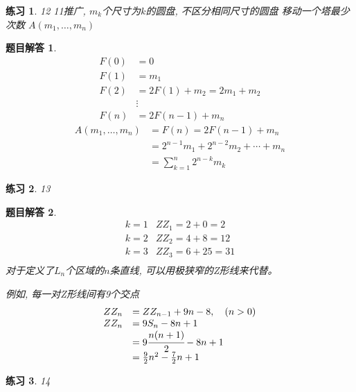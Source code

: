 \documentclass[mode=geye]{elegantnote}
\newtheorem{exercise}{练习}
\newtheorem{answer}{题目解答}
\begin{document}
\begin{exercise}
	12 11推广,	$ m_k $个尺寸为$ k $的圆盘, 不区分相同尺寸的圆盘
	移动一个塔最少次数 $ A(m_1, \dots, m_n) $
\end{exercise}

\begin{answer}
	\begin{align*}
		F(0) 	&= 0	\\
		F(1) 	&= m_1	\\
		F(2) 	&= 2F(1)+m_2 = 2m_1+m_2	\\
				&\vdots	\\
		F(n)	&= 2F(n-1)+m_n
	\end{align*}
	\begin{align*}
		A(m_1, \dots, m_n) 
		&= F(n) = 2F(n-1)+m_n\\
		&= 2^{n-1}m_1+2^{n-2}m_2+\cdots+m_n\\
		&= \sum_{k=1}^{n} 2^{n-k} m_{k}
	\end{align*}
\end{answer}

\begin{exercise}
	13
\end{exercise}

\begin{answer}
	\begin{equation*}
		\begin{array}{ll}
			k=1 & ZZ_1 = 2+0 = 2\\
			k=2	& ZZ_2 = 4+8 = 12\\
			k=3	& ZZ_3 = 6+25 = 31\\
		\end{array}
	\end{equation*}
对于定义了$ L_n $个区域的$ n $条直线, 
可以用极狭窄的Z形线来代替。

例如, 每一对Z形线间有9个交点
\begin{equation}
	\begin{array}{ll}
		ZZ_n 	&= ZZ_{n-1}+9n-8,\quad (n>0)\\
		ZZ_n	&= 9S_n - 8n+1\\
				&= 9\cfrac{n(n+1)}{2} - 8n+1\\
				&= \frac{9}{2}n^2 - \frac{7}{2}n + 1\\
	\end{array}
\end{equation}
\end{answer}

\begin{exercise}
	14
\end{exercise}
\end{document}
